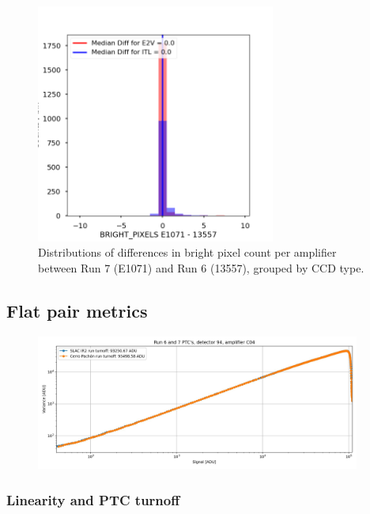 \begin{figure}[H]
\begin{centering}
\includegraphics[width=0.7\textwidth]{sections/figures/baselineCharacterization/BRIGHT_PIXELS_13557_E1071_diff.png}
\caption{Distributions of differences in bright pixel count per amplifier between Run 7 (E1071) and Run 6 (13557), grouped by CCD type.}
\label{fig:dark-dist}
\end{centering}
\end{figure}

\subsection{Flat pair metrics}\label{flat-pair-metrics}

\begin{figure}[H]
\begin{centering}
\includegraphics[width=0.95\textwidth]{sections/figures/baselineCharacterization/run7PTCsToDate.jpg}
\end{centering}
\end{figure}

\subsubsection{Linearity and PTC turnoff}\label{linearity-and-ptc-turnoff}

